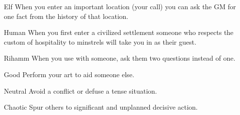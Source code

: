 \documentclass[8pt]{extarticle}
\begin{document}
\charbanner

\begin{minipage}[t]{3.2in}


\begin{optfeature}{Elf}
  When you enter an important location (your call) you can ask the GM
  for one fact from the history of that location.
\end{optfeature}

\begin{optfeature}{Human}
  When you first enter a civilized settlement someone who respects the
  custom of hospitality to minstrels will take you in as their guest.
\end{optfeature}

\begin{optfeature}{Rihamm}
  When you use  with someone, ask them two
  questions instead of one.
\end{optfeature}


\begin{optfeature}{Good}
  Perform your art to aid someone else.
\end{optfeature}

\begin{optfeature}{Neutral}
  Avoid a conflict or defuse a tense situation.
\end{optfeature}

\begin{optfeature}{Chaotic}
  Spur others to significant and unplanned decisive action.
\end{optfeature}

\vfill\null

\end{minipage}
\end{document}
